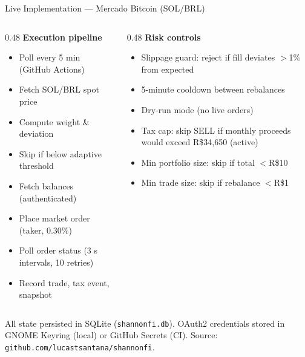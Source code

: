 \documentclass[aspectratio=169,10pt]{beamer}
\begin{document}
\begin{frame}{Live Implementation --- Mercado Bitcoin (SOL/BRL)}
\vspace{0.2em}
\small
\begin{columns}[T]
\begin{column}{0.48\textwidth}
\textbf{Execution pipeline}
\begin{itemize}
  \setlength\itemsep{0.12em}
  \item Poll every 5 min (GitHub Actions)
  \item Fetch SOL/BRL spot price
  \item Compute weight \& deviation
  \item Skip if below adaptive threshold
  \item Fetch balances (authenticated)
  \item Place market order (taker, 0.30\%)
  \item Poll order status (3 s intervals, 10 retries)
  \item Record trade, tax event, snapshot
\end{itemize}
\end{column}
\begin{column}{0.48\textwidth}
\textbf{Risk controls}
\begin{itemize}
  \setlength\itemsep{0.12em}
  \item Slippage guard: reject if fill deviates $>$1\% from expected
  \item 5-minute cooldown between rebalances
  \item Dry-run mode (no live orders)
  \item Tax cap: skip SELL if monthly proceeds would exceed R\$34{,}650 (active)
  \item Min portfolio size: skip if total $<$R\$10
  \item Min trade size: skip if rebalance $<$R\$1
\end{itemize}
\end{column}
\end{columns}

\vspace{0.3em}
{\scriptsize\color{MutedText}
All state persisted in SQLite (\texttt{shannonfi.db}).
OAuth2 credentials stored in GNOME Keyring (local) or GitHub Secrets (CI).
Source: \texttt{github.com/lucastsantana/shannonfi}.}
\end{frame}
\end{document}
